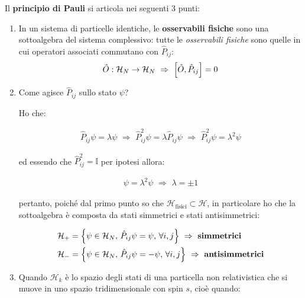\begin{myprinc}

	Il \textbf{principio di Pauli} si articola nei seguenti $3$ punti:

\begin{enumerate}[label=\arabic*)]

	\item In un sistema di particelle identiche, le \textbf{osservabili fisiche} sono una sottoalgebra del sistema complessivo: tutte le \textit{osservabili fisiche} sono quelle in cui operatori associati commutano con $\hat{P}_{ij}$:
	\begin{align*}
		\hat{O} : \mathcal{H}_N \to \mathcal{H}_N \, \, \Rightarrow \, \, \qty[\hat{O}, \hat{P}_{ij}] = 0
	\end{align*}

	\item Come agisce $\hat{P}_{ij}$ sullo stato $\psi$? 
	
		Ho che:
	
	\begin{align*}
		\hat{P}_{ij} \psi = \lambda \psi \, \, \Rightarrow \, \, \hat{P}_{ij}^2 \psi = \lambda \hat{P}_{ij} \psi \, \, \Rightarrow \, \, \hat{P}^2_{ij} \psi = \lambda^2 \psi 
	\end{align*}
	
		ed essendo che $\hat{P}^2_{ij} = \mathbb{I}$ per ipotesi allora:
		
	\begin{align*}
		\psi = \lambda^2 \psi  \, \, \Rightarrow \, \, \lambda = \pm 1
	\end{align*}

		pertanto, poiché dal primo punto so che $\mathcal{H}_{\text{fisici}} \subset \mathcal{H}$, in particolare ho che la sottoalgebra è composta da stati simmetrici e stati antisimmetrici:
		
	\begin{align*}
		& \mathcal{H}_+ = \qty{\psi \in \mathcal{H}_N, \, \hat{P}_{ij}\psi = \psi, \, \forall i, j } \, \, \Rightarrow \, \, \textbf{simmetrici} \\
		& \mathcal{H}_- = \qty{\psi \in \mathcal{H}_N, \, \hat{P}_{ij}\psi = - \psi, \, \forall i, j } \, \, \Rightarrow \, \, \textbf{antisimmetrici}
	\end{align*}
	
	\item Quando $\mathcal{H}_k$ è lo spazio degli stati di una particella non relativistica che si muove in uno spazio tridimensionale con spin $s$, cioè quando:
	

\end{enumerate}
\end{myprinc}
